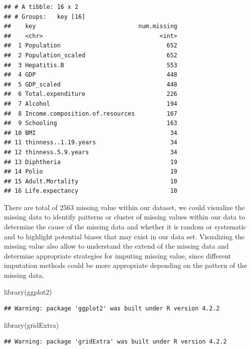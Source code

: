 \documentclass[
]{article}
\newenvironment{Shaded}{\begin{snugshade}}{\end{snugshade}}
\newcommand{\FunctionTok}[1]{\textcolor[rgb]{0.00,0.00,0.00}{#1}}
\newcommand{\NormalTok}[1]{#1}
\begin{document}
\begin{verbatim}
## # A tibble: 16 x 2
## # Groups:   key [16]
##    key                             num.missing
##    <chr>                                 <int>
##  1 Population                              652
##  2 Population_scaled                       652
##  3 Hepatitis.B                             553
##  4 GDP                                     448
##  5 GDP_scaled                              448
##  6 Total.expenditure                       226
##  7 Alcohol                                 194
##  8 Income.composition.of.resources         167
##  9 Schooling                               163
## 10 BMI                                      34
## 11 thinness..1.19.years                     34
## 12 thinness.5.9.years                       34
## 13 Diphtheria                               19
## 14 Polio                                    19
## 15 Adult.Mortality                          10
## 16 Life.expectancy                          10
\end{verbatim}

There are total of 2563 missing value within our dataset, we could
visualize the missing data to identify patterns or cluster of missing
values within our data to determine the cause of the missing data and
whether it is random or systematic and to highlight potential biases
that may exist in our data set. Visualizing the missing value also allow
to understand the extend of the missing data and determine appropriate
strategies for imputing missing value, since different imputation
methods could be more appropriate depending on the pattern of the
missing data.

\begin{Shaded}
\begin{Highlighting}[]
\FunctionTok{library}\NormalTok{(ggplot2)}
\end{Highlighting}
\end{Shaded}

\begin{verbatim}
## Warning: package 'ggplot2' was built under R version 4.2.2
\end{verbatim}

\begin{Shaded}
\begin{Highlighting}[]
\FunctionTok{library}\NormalTok{(gridExtra)}
\end{Highlighting}
\end{Shaded}

\begin{verbatim}
## Warning: package 'gridExtra' was built under R version 4.2.2
\end{verbatim}
\end{document}
